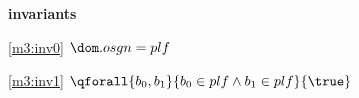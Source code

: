 \textbf{invariants}
\begin{block}
\item[ \eqref{m3:inv0} ]$\dom.osgn = plf $ %
\item[ \eqref{m3:inv1} ]$\qforall{b_0,b_1}{ b_0 \in plf \land b_1 \in plf }{ \true } $ %
\end{block}
